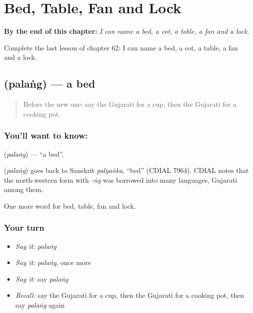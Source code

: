 
\chapter{Bed, Table, Fan and Lock}
\label{ch:gu-bed-table-fan-and-lock}

\begin{chapteropening}
\textbf{By the end of this chapter:} \emph{I can name a bed, a cot, a table, a fan and a lock.}

Complete the last lesson of chapter 62: I can name a bed, a cot, a table, a fan and a lock.
\end{chapteropening}

\section[\texorpdfstring{\gu{પલંગ} (palaṅg)}{પલંગ (palaṅg)}]{ (palaṅg) — a bed}

\label{lesson:GU-C62-bed}



\begin{quote}
Before the new one: say the Gujarati for a cup, then the Gujarati for a cooking pot.
\end{quote}

\subsection*{You'll want to know: }
\textbf{} (\emph{palaṅg}) — \textquotedblleft{}a bed\textquotedblright{}.

\begin{cousinweb}
\textbf{} (\emph{palaṅg}) goes back to Sanskrit \emph{palyaṅka}, \textquotedblleft{}bed\textquotedblright{} (CDIAL 7964). CDIAL notes that the north-western form with \emph{-ṅg} was borrowed into many languages, Gujarati among them.
\end{cousinweb}

\begin{grammarlens}[title={What you've built}]
One more word for bed, table, fan and lock.
\end{grammarlens}

\subsection*{Your turn}
\begin{itemize}
\raggedright
  \item \emph{Say it:} \emph{palaṅg}
  \item \emph{Say it:} \emph{palaṅg}, once more
  \item \emph{Say it:} say \emph{palaṅg}
  \item \emph{Recall:} say the Gujarati for a cup, then the Gujarati for a cooking pot, then say \emph{palaṅg} again
\end{itemize}

